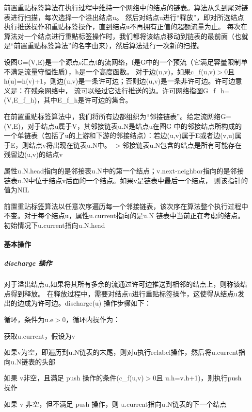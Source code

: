 前置重贴标签算法在执行过程中维持一个网络中的结点的链表。算法从头到尾对链表进行扫描，每次选择一个溢出结点u。 然后对结点u进行“释放”，即对所选结点执行推送操作和重贴标签操作，直到结点u不再拥有正值的超额流量为止。 每次在算法对一个结点进行重贴标签操作时，我们都将该结点移动到链表的最前面（也就是“前置重贴标签算法”的名字由来），然后算法进行一次新的扫描。

设图\+G=(V,E)是一个源点s汇点t的流网络，f是\+G中的一个预流（它满足容量限制单不满足流量守恒性质），h是一个高度函数。 对于边(u,v)，如果c\+\_\+f(u,v)$>$0且h(u)=h(v)+1，则边(u,v)是一条许可边；否则边(u,v)是一条非许可边。许可边意义是：在残余网络中， 流可以经过它进行推送的边。许可网络指图\+G\+\_\+f\+\_\+h=(V,E\+\_\+f\+\_\+h)，其中\+E\+\_\+f\+\_\+h是许可边的集合。

在前置重贴标签算法中，我们将所有边都组织为“邻接链表”。给定流网络\+G=(V,E)，对于结点u属于\+V，其邻接链表u.\+N是结点u在图\+G 中的邻接结点所构成的一个单链表（包括了u的上游和下游的邻接结点）：若边(u,v)属于\+E或者边(v,u)属于\+E，则结点v将出现在链表u.\+N中。 $>$邻接链表u.\+N包含的结点是所有可能存在残留边(u,v)的结点v

属性u.\+N.\+head指向的是邻接表u.\+N中的第一个结点；v.\+next-\/neighbor指向的是邻接链表u.N中位于结点v后面的一个结点。如果v是链表中最后一个结点， 则该指针的值为\+N\+I\+L

前置重贴标签算法以任意次序遍历每一个邻接链表，该次序在算法整个执行过程中不变。对于每个结点u，属性u.\+current指向的是u.\+N 链表中当前正在考虑的结点。初始情况下u.\+current指向u.\+N.\+head

\paragraph*{基本操作}

\subparagraph*{discharge 操作}

对于溢出结点u,如果将其所有多余的流通过许可边推送到相邻的结点上，则称该结点得到释放。 在释放过程中，需要对结点u进行重贴标签操作，这使得从结点u发出的边成为许可边。discharge(u) 操作步骤如下：


\begin{DoxyItemize}
\item 循环，条件为u.\+e$>$0，循环内操作为：
\begin{DoxyItemize}
\item 获取u.\+current，假设为v
\item 如果v为空，即遍历到u.\+N链表的末尾，则对u执行relabel操作，然后将u.\+current指向u.\+N链表的头部
\item 如果 v非空，且满足 push 操作的条件(c\+\_\+f(u,v)$>$0且 u.\+h=v.\+h+1)，则执行push操作
\item 如果 v 非空，但不满足 push 操作，则 u.\+current指向u.\+N链表的下一个结点
\end{DoxyItemize}
\end{DoxyItemize}

